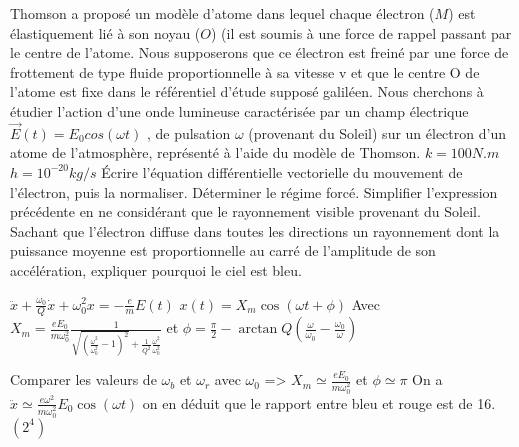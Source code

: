 \begin{Exercise}[title=Pourquoi le ciel est-il bleu?]
	Thomson a proposé un modèle d’atome dans lequel chaque électron ($M$) est élastiquement lié à son noyau ($O$) (il est soumis à une force de rappel passant par le centre de l’atome. Nous supposerons que ce électron est freiné par une force de frottement de type fluide proportionnelle à sa vitesse	v et que le centre O de l’atome est fixe dans le référentiel d’étude supposé galiléen. Nous cherchons à étudier l’action d’une onde lumineuse caractérisée par un	champ électrique $\vec{E}(t) = E_0 cos(\omega t)$ , de pulsation $\omega$ (provenant du Soleil) sur un électron	d’un atome de l’atmosphère, représenté à l’aide du modèle de Thomson.
	$k=100N.m$ $ h= 10^{-20}kg/s$
	\Question Écrire l’équation différentielle vectorielle du mouvement de
    l’électron, puis la normaliser.
	\Question Déterminer le régime forcé.
	\Question Simplifier l’expression précédente  en ne considérant que le
    rayonnement visible provenant du Soleil.
	\Question Sachant que l’électron diffuse dans toutes les directions un
    rayonnement dont la puissance	moyenne est proportionnelle au carré de
    l’amplitude de son accélération, expliquer pourquoi le ciel est bleu.
\end{Exercise}
\begin{Answer}
	\Question $\ddot{x}+\frac{\omega_0}{Q}\dot{x}+\omega_0^2x = -\frac{e}{m}E(t)$
	\Question $x(t)=X_m \cos(\omega t+ \phi)$ Avec $X_m =
    \frac{eE_0}{m\omega_0^2}\frac{1}{\sqrt{\left(\frac{\omega^2}{\omega_0^2}-1\right)^2}+\frac{1}{Q^2}\frac{\omega^2}{\omega_0^2}}$
    et $\phi = \frac{\pi}{2}-\arctan Q(\frac{\omega}{\omega_0}-\frac{\omega_0}{\omega})$

	\Question Comparer les valeurs de $\omega_b$ et $\omega_r$ avec $\omega_0$ => $X_m \simeq
    \frac{eE_0}{m\omega_0^2}$ et $ \phi \simeq \pi$
	\Question On a $\ddot{x} \simeq \frac{e\omega^2}{m\omega_0^2}E_0 \cos(\omega t)$ on en déduit que
    le rapport entre bleu et rouge est de 16.$ (2^4)$
\end{Answer}
